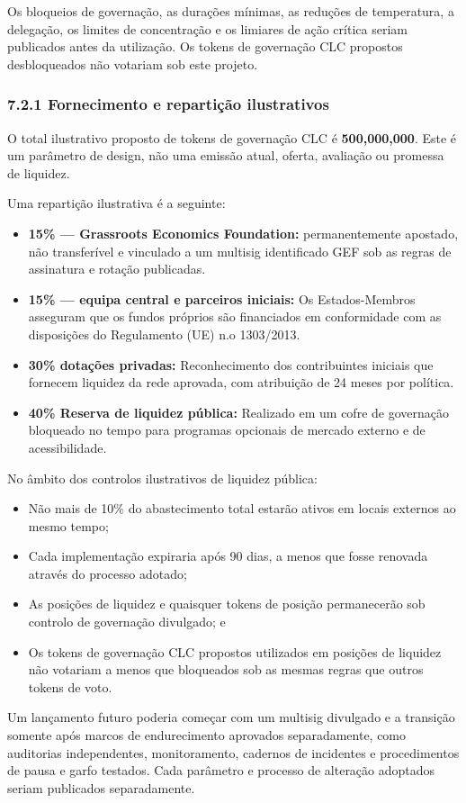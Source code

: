 \documentclass[11pt]{article}
\begin{document}
Os bloqueios de governação, as durações mínimas, as reduções de temperatura, a delegação, os limites de concentração e os limiares de ação crítica seriam publicados antes da utilização. Os tokens de governação CLC propostos desbloqueados não votariam sob este projeto.

\subsubsection*{7.2.1 Fornecimento e repartição ilustrativos}

O total ilustrativo proposto de tokens de governação CLC é \textbf{500,000,000}. Este é um parâmetro de design, não uma emissão atual, oferta, avaliação ou promessa de liquidez.

Uma repartição ilustrativa é a seguinte:

\begin{itemize}[leftmargin=*]
\item \textbf{15\% --- Grassroots Economics Foundation:} permanentemente apostado, não transferível e vinculado a um multisig identificado GEF sob as regras de assinatura e rotação publicadas.
\item \textbf{15\% --- equipa central e parceiros iniciais:} Os Estados-Membros asseguram que os fundos próprios são financiados em conformidade com as disposições do Regulamento (UE) n.o 1303/2013.
\item \textbf{30\%  dotações privadas:} Reconhecimento dos contribuintes iniciais que fornecem liquidez da rede aprovada, com atribuição de 24 meses por política.
\item \textbf{40\%  Reserva de liquidez pública:} Realizado em um cofre de governação bloqueado no tempo para programas opcionais de mercado externo e de acessibilidade.
\end{itemize}
No âmbito dos controlos ilustrativos de liquidez pública:

\begin{itemize}[leftmargin=*]
\item Não mais de 10\% do abastecimento total estarão ativos em locais externos ao mesmo tempo;
\item Cada implementação expiraria após 90 dias, a menos que fosse renovada através do processo adotado;
\item As posições de liquidez e quaisquer tokens de posição permanecerão sob controlo de governação divulgado; e
\item Os tokens de governação CLC propostos utilizados em posições de liquidez não votariam a menos que bloqueados sob as mesmas regras que outros tokens de voto.
\end{itemize}
Um lançamento futuro poderia começar com um multisig divulgado e a transição somente após marcos de endurecimento aprovados separadamente, como auditorias independentes, monitoramento, cadernos de incidentes e procedimentos de pausa e garfo testados. Cada parâmetro e processo de alteração adoptados seriam publicados separadamente.
\end{document}
